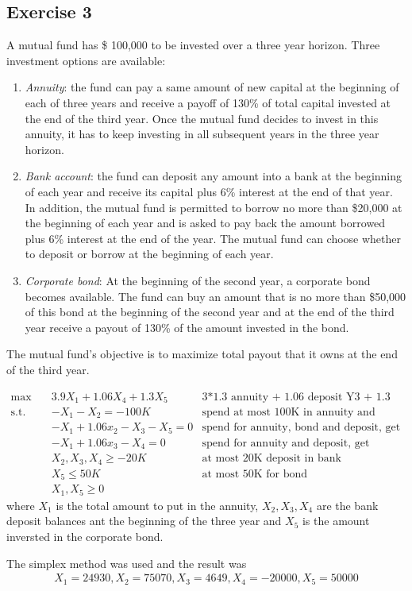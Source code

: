 \subsection{Exercise 3}
A mutual fund has \$ 100,000 to be invested over a three year horizon.
Three investment options are available:
\begin{enumerate}
    \item \textit{Annuity}: the fund can pay a same amount of new capital at the beginning of each of three years and receive a payoff of 130\% of total capital invested at the end of the third year. Once the mutual fund decides to invest in this annuity, it has to keep investing in all subsequent years in the three year horizon.
    \item \textit{Bank account}: the fund can deposit any amount into a bank at the beginning of each year and receive its capital plus 6\% interest at the end of that year. In addition, the mutual fund is permitted to borrow no more than \$20,000 at the beginning of each year and is asked to pay back the amount borrowed plus 6\% interest at the end of the year. The mutual fund can choose whether to deposit or borrow at the beginning of each year.
    \item \textit{Corporate bond}: At the beginning of the second year, a corporate bond becomes available. The fund can buy an amount that is no more than \$50,000 of this bond at the beginning of the second year and at the end of the third year receive a payout of 130\% of the amount invested in the bond.
\end{enumerate}
The mutual fund’s objective is to maximize total payout that it owns at the end of the third year.

\begin{equation}
    \begin{aligned}
        \text{max} \quad   & 3.9X_1 + 1.06X_4 + 1.3X_5  & \text{3*1.3 annuity + 1.06 deposit Y3 + 1.3 bond } \\
        \text{s.t.} \quad & - X_1 - X_2 = - 100K      & \text{spend at most 100K in annuity and deposit}        \\
                                & - X_1 + 1.06x_2 - X_3 - X_5 = 0 & \text{spend for annuity, bond and deposit, get capital Y1}        \\
                                & - X_1 + 1.06x_3 - X_4 = 0       & \text{spend for annuity and deposit, get capital Y2}        \\
                                & X_2, X_3, X_4 \ge -20K   & \text{at most 20K deposit in bank}        \\
                                & X_5 \leq 50K             & \text{at most 50K for bond}         \\
                                & X_1, X_5 \geq 0                 &
    \end{aligned}
\end{equation}
where $X_1$ is the total amount to put in the annuity, $X_2, X_3, X_4$ are the bank deposit balances ant the beginning of the three year and $X_5$ is the amount inversted in the corporate bond.

The simplex method was used and the result was
\begin{equation}
    \begin{aligned}
        X_1 = 24930, X_2 = 75070, X_3 = 4649, X_4 = -20000, X_5 = 50000
    \end{aligned}
\end{equation}

